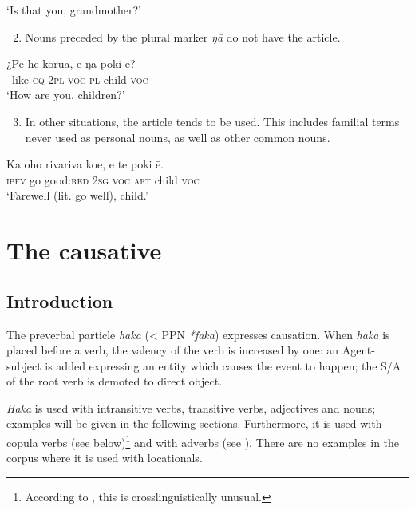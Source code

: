 \glt
‘Is that you, grandmother?’ \textstyleExampleref{[R313.119]} 
\z

\begin{enumerate}
\setcounter{enumi}{1}
\item 
Nouns preceded by the plural marker \textit{ŋā} do not have the article.
\end{enumerate}

\ea\label{ex:8.218}
\gll ¿Pē hē kōrua, e ŋā poki ē?\\
~like \textsc{cq} \textsc{2pl} \textsc{voc} \textsc{pl} child \textsc{voc}\\

\glt
‘How are you, children?’ \textstyleExampleref{[R359.007]} 
\z

\begin{enumerate}
\setcounter{enumi}{2}
\item 
In other situations, the article tends to be used. This includes familial terms never used as personal nouns, as well as other common nouns.
\end{enumerate}

\ea\label{ex:8.219}
\gll Ka oho rivariva koe, e te poki ē. \\
\textsc{ipfv} go good:\textsc{red} \textsc{2sg} \textsc{voc} \textsc{art} child \textsc{voc} \\

\glt 
‘Farewell (lit. go well), child.’ \textstyleExampleref{[R210.047]} 
\z

\section{The causative}\label{sec:8.12}
\subsection{Introduction}\label{sec:8.12.1}

The preverbal particle \textit{haka} ({\textless} PPN \textit{*faka}) expresses causation. When \textit{haka} is placed before a verb, the valency of the verb is increased by one: an Agent-subject is added expressing an entity which causes the event to happen; the S/A of the root verb is demoted to direct object.

\textit{Haka} is used with intransitive verbs, transitive verbs, adjectives and nouns; examples will be given in the following sections. Furthermore, it is used with copula verbs (see  below)\footnote{\label{fn:454}According to \citet[251]{Dixon2012}, this is crosslinguistically unusual.} and with adverbs (see ). There are no examples in the corpus where it is used with locationals.

